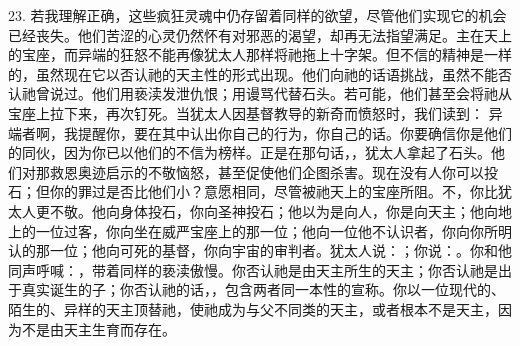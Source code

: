 23. 若我理解正确，这些疯狂灵魂中仍存留着同样的欲望，尽管他们实现它的机会已经丧失。他们苦涩的心灵仍然怀有对邪恶的渴望，却再无法指望满足。主在天上的宝座，而异端的狂怒不能再像犹太人那样将祂拖上十字架。但不信的精神是一样的，虽然现在它以否认祂的天主性的形式出现。他们向祂的话语挑战，虽然不能否认祂曾说过。他们用亵渎发泄仇恨；用谩骂代替石头。若可能，他们甚至会将祂从宝座上拉下来，再次钉死。当犹太人因基督教导的新奇而愤怒时，我们读到： 异端者啊，我提醒你，要在其中认出你自己的行为，你自己的话。你要确信你是他们的同伙，因为你已以他们的不信为榜样。正是在那句话，，犹太人拿起了石头。他们对那救恩奥迹启示的不敬恼怒，甚至促使他们企图杀害。现在没有人你可以投石；但你的罪过是否比他们小？意愿相同，尽管被祂天上的宝座所阻。不，你比犹太人更不敬。他向身体投石，你向圣神投石；他以为是向人，你是向天主；他向地上的一位过客，你向坐在威严宝座上的那一位；他向一位他不认识者，你向你所明认的那一位；他向可死的基督，你向宇宙的审判者。犹太人说：；你说：。你和他同声呼喊：，带着同样的亵渎傲慢。你否认祂是由天主所生的天主；你否认祂是出于真实诞生的子；你否认祂的话，，包含两者同一本性的宣称。你以一位现代的、陌生的、异样的天主顶替祂，使祂成为与父不同类的天主，或者根本不是天主，因为不是由天主生育而存在。\par

